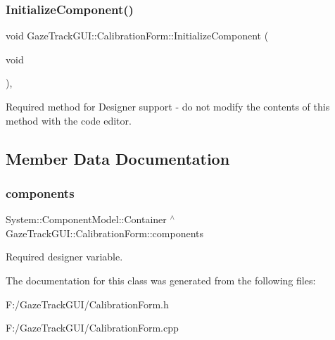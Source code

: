\subsubsection{\texorpdfstring{Initialize\+Component()}{InitializeComponent()}}
{\footnotesize\ttfamily void Gaze\+Track\+G\+U\+I\+::\+Calibration\+Form\+::\+Initialize\+Component (\begin{DoxyParamCaption}\item[{void}]{ }\end{DoxyParamCaption})\hspace{0.3cm}{\ttfamily [inline]}, {\ttfamily [private]}}



Required method for Designer support -\/ do not modify the contents of this method with the code editor. 



\subsection{Member Data Documentation}
\mbox{\label{class_gaze_track_g_u_i_1_1_calibration_form_a27cbe7b426a34ce1e7509ecf62a3d3a3}} 
\subsubsection{\texorpdfstring{components}{components}}
{\footnotesize\ttfamily System\+::\+Component\+Model\+::\+Container $^\wedge$ Gaze\+Track\+G\+U\+I\+::\+Calibration\+Form\+::components\hspace{0.3cm}{\ttfamily [private]}}



Required designer variable. 



The documentation for this class was generated from the following files\+:\begin{DoxyCompactItemize}
\item 
F\+:/\+Gaze\+Track\+G\+U\+I/Calibration\+Form.\+h\item 
F\+:/\+Gaze\+Track\+G\+U\+I/Calibration\+Form.\+cpp\end{DoxyCompactItemize}
